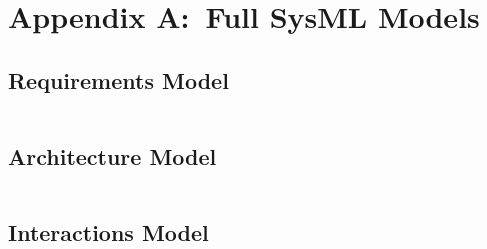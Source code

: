 
\printbibliography[heading=bibintoc,title={References}]



\appendix
\section*{Appendix A:\ Full SysML Models}

\subsection*{Requirements Model}
\inputminted{text}{ressources/models/requirements.sysml}

\subsection*{Architecture Model}
\inputminted{text}{ressources/models/architecture.sysml}

\subsection*{Interactions Model}
\inputminted{text}{ressources/models/interactions.sysml}



